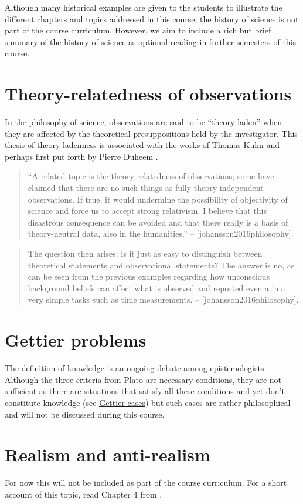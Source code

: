 \documentclass[
]{book}
\begin{document}
Although many historical examples are given to the students to illustrate the different chapters and topics addressed in this course, the history of science is not part of the course curriculum. However, we aim to include a rich but brief summary of the history of science as optional reading in further semesters of this course.

\hypertarget{theory-relatedness-of-observations}{%
\section{Theory-relatedness of observations}\label{theory-relatedness-of-observations}}

In the philosophy of science, observations are said to be ``theory-laden'' when they are affected by the theoretical presuppositions held by the investigator. This thesis of theory-ladenness is associated with the works of Thomas Kuhn and perhaps first put forth by Pierre Duheem \citep{sep-science-theory-observation}.

\begin{quote}
``A related topic is the theory-relatedness of observations; some have claimed that there are no such things as fully theory-independent observations. If true, it would undermine the possibility of objectivity of science and force us to accept strong relativism. I believe that this disastrous consequence can be avoided and that there really is a basis of theory-neutral data, also in the humanities.'' -- {[}johansson2016philosophy{]}.
\end{quote}

\begin{quote}
The question then arises: is it just as easy to distinguish between theoretical statements and observational statements? The answer is no, as can be seen from the previous examples regarding how unconscious background beliefs can affect what is observed and reported even a in a very simple tasks such as time measurements. -- {[}johansson2016philosophy{]}.
\end{quote}

\hypertarget{gettier-problems}{%
\section{Gettier problems}\label{gettier-problems}}

The definition of knowledge is an ongoing debate among epistemologists. Although the three criteria from Plato are necessary conditions, they are not sufficient as there are situations that satisfy all these conditions and yet don't constitute knowledge (see \href{https://en.wikipedia.org/wiki/Gettier_case}{Gettier cases}) but such cases are rather philosophical and will not be discussed during this course.

\hypertarget{realism}{%
\section{Realism and anti-realism}\label{realism}}

For now this will not be included as part of the course curriculum. For a short account of this topic, read Chapter 4 from \citep{okasha-pos}.

  
\end{document}
